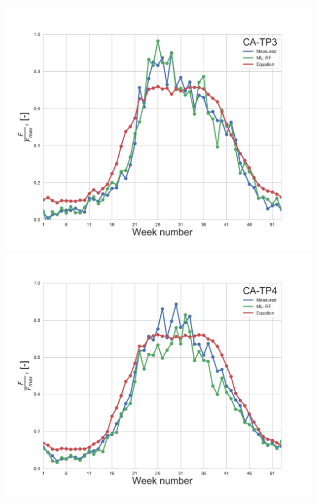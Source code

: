 \documentclass{beamer}
\begin{document}
\begin{frame}
\begin{columns}[t]
\centering
\includegraphics[width=\textwidth]{F_scaled_ML_ENF_Only_T_With9010_Quartiles/eq/CA-TP3.png}\\
\includegraphics[width=\textwidth]{F_scaled_ML_ENF_Only_T_With9010_Quartiles/eq/CA-TP4.png}
\end{columns}

\end{frame}




\end{document}
